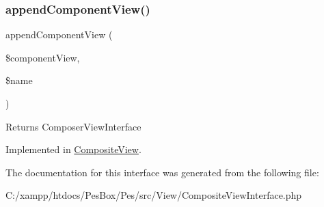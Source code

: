 \subsubsection{\texorpdfstring{append\+Component\+View()}{appendComponentView()}}
{\footnotesize\ttfamily append\+Component\+View (\begin{DoxyParamCaption}\item[{\mbox{\hyperlink{interface_pes_1_1_view_1_1_view_interface}{View\+Interface}}}]{\$component\+View,  }\item[{}]{\$name }\end{DoxyParamCaption})}

\begin{DoxyReturn}{Returns}
Composer\+View\+Interface 
\end{DoxyReturn}


Implemented in \mbox{\hyperlink{class_pes_1_1_view_1_1_composite_view_a2ab16e76a45210ebd3f14c0df914f3b9}{Composite\+View}}.



The documentation for this interface was generated from the following file\+:\begin{DoxyCompactItemize}
\item 
C\+:/xampp/htdocs/\+Pes\+Box/\+Pes/src/\+View/Composite\+View\+Interface.\+php\end{DoxyCompactItemize}
